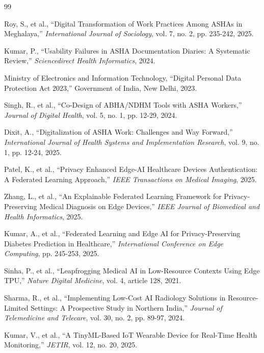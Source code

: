 \documentclass[conference,compsoc]{IEEEtran}
\begin{document}
\begin{thebibliography}{99}

Roy, S., et al., ``Digital Transformation of Work Practices Among ASHAs in Meghalaya,'' \textit{International Journal of Sociology}, vol. 7, no. 2, pp. 235-242, 2025.

Kumar, P., ``Usability Failures in ASHA Documentation Diaries: A Systematic Review,'' \textit{Sciencedirect Health Informatics}, 2024.

Ministry of Electronics and Information Technology, ``Digital Personal Data Protection Act 2023,'' Government of India, New Delhi, 2023.

Singh, R., et al., ``Co-Design of ABHA/NDHM Tools with ASHA Workers,'' \textit{Journal of Digital Health}, vol. 5, no. 1, pp. 12-29, 2024.

Dixit, A., ``Digitalization of ASHA Work: Challenges and Way Forward,'' \textit{International Journal of Health Systems and Implementation Research}, vol. 9, no. 1, pp. 12-24, 2025.

Patel, K., et al., ``Privacy Enhanced Edge-AI Healthcare Devices Authentication: A Federated Learning Approach,'' \textit{IEEE Transactions on Medical Imaging}, 2025.

Zhang, L., et al., ``An Explainable Federated Learning Framework for Privacy-Preserving Medical Diagnosis on Edge Devices,'' \textit{IEEE Journal of Biomedical and Health Informatics}, 2025.

Kumar, A., et al., ``Federated Learning and Edge AI for Privacy-Preserving Diabetes Prediction in Healthcare,'' \textit{International Conference on Edge Computing}, pp. 245-253, 2025.

Sinha, P., et al., ``Leapfrogging Medical AI in Low-Resource Contexts Using Edge TPU,'' \textit{Nature Digital Medicine}, vol. 4, article 128, 2021.

Sharma, R., et al., ``Implementing Low-Cost AI Radiology Solutions in Resource-Limited Settings: A Prospective Study in Northern India,'' \textit{Journal of Telemedicine and Telecare}, vol. 30, no. 2, pp. 89-97, 2024.

Kumar, V., et al., ``A TinyML-Based IoT Wearable Device for Real-Time Health Monitoring,'' \textit{JETIR}, vol. 12, no. 20, 2025.


\end{thebibliography}
\end{document}
